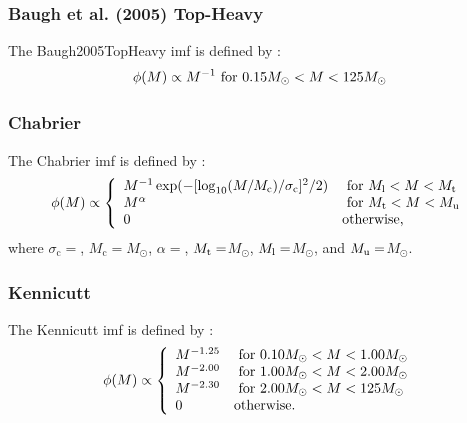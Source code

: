 \subsubsection{Baugh et al. (2005) Top-Heavy}

The {\normalfont \ttfamily Baugh2005TopHeavy} \gls{imf} is defined by \citep{baugh_can_2005}:
\begin{equation}
 \phi(M) \propto 
 M^{-1} \hbox{ for } 0.15M_\odot < M < 125M_\odot
\end{equation}

\subsubsection{Chabrier}

The {\normalfont \ttfamily Chabrier} \gls{imf} is defined by \citep{chabrier_galactic_2001}:
\begin{equation}
 \phi(M) \propto \left\{ \begin{array}{ll}
 M^{-1} \exp(-[\log_{10}(M/M_{\mathrm c})/\sigma_{\mathrm c}]^2/2) & \hbox{ for } M_{\rm l} < M < M_{\rm t}  \\
 M^\alpha & \hbox{ for } M_{\rm t} < M < M_{\rm u} \\
 0 & \hbox {otherwise,} \end{array} \right.
\end{equation}
where $\sigma_{\mathrm c}=${\normalfont \ttfamily [imfChabrierSigma]}, $M_{\mathrm c}=${\normalfont \ttfamily [imfChabrierMass]}$M_\odot$, $\alpha=${\normalfont \ttfamily [imfChabrierExponent]}, $M_{\rm t}=${\normalfont \ttfamily [imfChabrierMassTransition]}$M_\odot$, $M_{\rm l}=${\normalfont \ttfamily [imfChabrierMassLower]}$M_\odot$, and $M_{\rm u}=${\normalfont \ttfamily [imfChabrierMassUpper]}$M_\odot$.

\subsubsection{Kennicutt}

The {\normalfont \ttfamily Kennicutt} \gls{imf} is defined by \citep{kennicutt_rate_1983}:
\begin{equation}
 \phi(M) \propto \left\{ \begin{array}{ll}
 M^{-1.25} & \hbox{ for } 0.10M_\odot < M < 1.00M_\odot \\
 M^{-2.00} & \hbox{ for } 1.00M_\odot < M < 2.00M_\odot \\
 M^{-2.30} & \hbox{ for } 2.00M_\odot < M < 125M_\odot \\
 0 & \hbox {otherwise.} \end{array} \right.
\end{equation}

